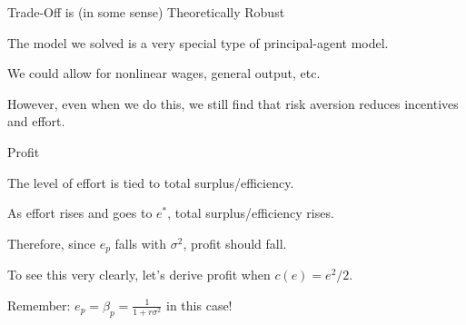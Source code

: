 \documentclass[aspectratio=169,usenames,dvipsnames]{beamer}
\newenvironment{wideitemize}{\itemize\addtolength{\itemsep}{10pt}}{\enditemize}
\begin{document}

\begin{frame}{Trade-Off is (in some sense) Theoretically Robust}
\begin{wideitemize}
    \item The model we solved is a very special type of principal-agent model.
    \item We could allow for nonlinear wages, general output, etc.
    \item However, even when we do this, we still find that risk aversion reduces incentives and effort.
\end{wideitemize}
    
\end{frame}

\begin{frame}{Profit}

\begin{wideitemize}
    \item The level of effort is tied to total surplus/efficiency.
    \item As effort rises and goes to $e^*$, total surplus/efficiency rises.
    \item Therefore, since $e_p$ falls with $\sigma^2$, profit should fall.
    \item To see this very clearly, let's derive profit when $c(e)=e^2/2$.
    \item Remember: $e_p=\beta_p=\frac{1}{1+r \sigma^2}$ in this case!
\end{wideitemize}

\end{frame}
\end{document}
